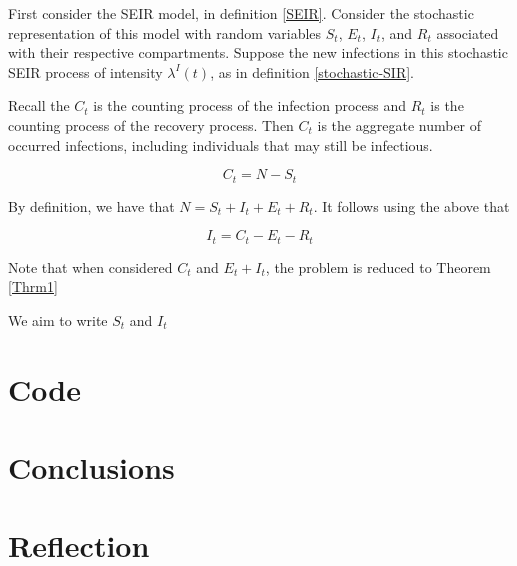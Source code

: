 \documentclass[12pt]{article}
\begin{document}
First consider the SEIR model, in definition \ref{SEIR}. Consider the stochastic representation of this  model with random variables $S_t$, $E_t$, $I_t$, and $R_t$ associated with their respective compartments. Suppose the new infections in this stochastic SEIR process of intensity $\lambda^I(t)$, as in definition \ref{stochastic-SIR}.

Recall the $C_t$ is the counting process of the infection process and $R_t$ is the counting process of the recovery process. Then $C_t$ is the aggregate number of occurred infections, including individuals that may still be infectious. 

$$
C_t = N - S_t
$$

By definition, we have that $N = S_t + I_t + E_t + R_t$. It follows using the above that

$$
I_t =  C_t - E_t - R_t
$$


Note that when considered $C_t$ and $E_t + I_t$, the problem is reduced to Theorem \ref{Thrm1}



We aim to write $S_t$ and $I_t$

\section{Code}

















\section{Conclusions}




\section{Reflection}









\pagebreak

\nocite{*}












\end{document}
